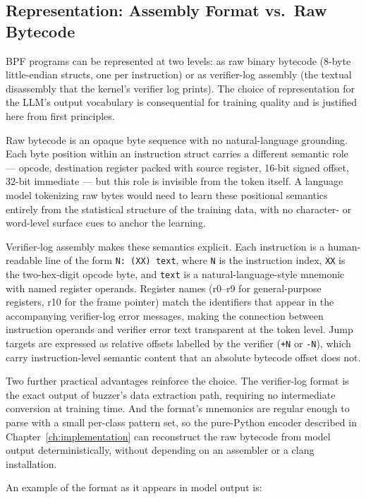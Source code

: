 \subsection{Representation: Assembly Format vs.\ Raw Bytecode}
\label{sec:format-decision}

BPF programs can be represented at two levels: as raw binary bytecode
(8-byte little-endian structs, one per instruction) or as verifier-log assembly
(the textual disassembly that the kernel's verifier log prints).
The choice of representation for the LLM's output vocabulary is consequential for
training quality and is justified here from first principles.

Raw bytecode is an opaque byte sequence with no natural-language grounding.
Each byte position within an instruction struct carries a different semantic role
--- opcode, destination register packed with source register, 16-bit signed
offset, 32-bit immediate --- but this role is invisible from the token itself.
A language model tokenizing raw bytes would need to learn these positional
semantics entirely from the statistical structure of the training data, with no
character- or word-level surface cues to anchor the learning.

Verifier-log assembly makes these semantics explicit.
Each instruction is a human-readable line of the form \texttt{N: (XX) text},
where \texttt{N} is the instruction index, \texttt{XX} is the two-hex-digit
opcode byte, and \texttt{text} is a natural-language-style mnemonic with named
register operands.
Register names (r0--r9 for general-purpose registers, r10 for the frame pointer)
match the identifiers that appear in the accompanying verifier-log error messages,
making the connection between instruction operands and verifier error text
transparent at the token level.
Jump targets are expressed as relative offsets labelled by the verifier
(\texttt{+N} or \texttt{-N}), which carry instruction-level semantic content that
an absolute bytecode offset does not.

Two further practical advantages reinforce the choice.
The verifier-log format is the exact output of buzzer's data extraction path,
requiring no intermediate conversion at training time.
And the format's mnemonics are regular enough to parse with a small per-class
pattern set, so the pure-Python encoder described in Chapter~\ref{ch:implementation}
can reconstruct the raw bytecode from model output deterministically, without
depending on an assembler or a clang installation.

An example of the format as it appears in model output is:


